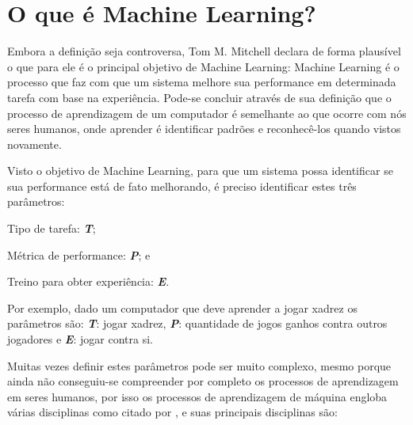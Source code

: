 \section{O que é Machine Learning?}
\label{sec:oqueemachinelearning}

Embora a definição seja controversa, Tom M. Mitchell declara de forma plausível o que para ele é o principal objetivo de Machine Learning: Machine Learning é o processo que faz com que um sistema melhore
sua performance em determinada tarefa com base na experiência\cite{Tom}. Pode-se concluir através de sua definição que o processo de aprendizagem de um 
computador é semelhante ao que ocorre com nós seres humanos, onde aprender é identificar padrões e reconhecê-los quando vistos novamente.

Visto o objetivo de Machine Learning, para que um sistema possa identificar se sua performance está de fato melhorando, é preciso identificar estes três parâmetros:
 \begin{alineascomponto}
	\item Tipo de tarefa: \textbf{\textit{T}};
	\item Métrica de performance: \textbf{\textit{P}}; e
	\item Treino para obter experiência: \textbf{\textit{E}}.			
\end{alineascomponto}
Por exemplo, dado um computador que deve aprender a jogar xadrez os parâmetros são: \textbf{\textit{T}}: jogar xadrez, \textbf{\textit{P}}: quantidade de jogos ganhos contra outros jogadores e
\textbf{\textit{E}}: jogar contra si.

Muitas vezes definir estes parâmetros pode ser muito complexo, mesmo porque ainda não conseguiu-se compreender por completo os processos
de aprendizagem em seres humanos, por isso os processos de aprendizagem de máquina engloba várias disciplinas como citado por \cite{Tom}, e suas principais disciplinas são: 
 
